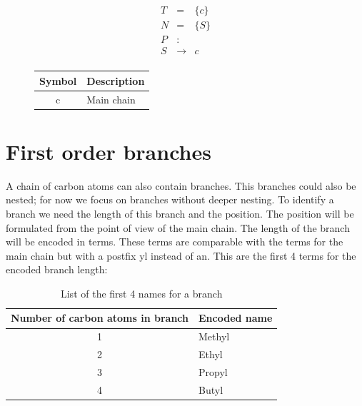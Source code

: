 \documentclass[
fontsize=11pt,
paper=a4,
abstract=true,
numbers=noenddot,
listof=totoc,
bibliography=totoc,
twoside,
open=right,
cleardoublepage=plain,
parskip=half+, %
BCOR=1cm, %
]{scrreprt}
\newcommand{\gerquot}[1]{\glqq#1\grqq}
\newcommand{\captionVSpace}{\vspace*{-0.05cm}}
\newcommand{\CFGDefinitionSize}{0.60}
\newcommand{\SymbolDescriptionTable}{0.35}
\begin{document}
\begin{figure}[H]
    \begin{minipage}[l]{\CFGDefinitionSize\textwidth}
        $$
        \begin{aligned}
            T &=& \{c\} \\
            N &=& \{S\} \\
            P &:& \\
            S &\rightarrow& c \\
        \end{aligned}
        $$
        \caption{The CFG with only straight chains.}
        \label{fig:CFGOnlyStraightChains}
    \end{minipage}
    \begin{minipage}[r]{\SymbolDescriptionTable\textwidth}
        \begin{table}[H]
        \centering
            \begin{tabular}{c|l}
                \toprule
                \textbf{Symbol} & \textbf{Description} \\
                \midrule
                c & Main chain \\
                \bottomrule
            \end{tabular}
        \end{table}
    \end{minipage}
\end{figure}



\section{First order branches}\label{ss:FirstOrderBranches}
A chain of carbon atoms can also contain branches. This branches could also be nested; for now we focus on branches without deeper nesting. To identify a branch we need the length of this branch and the position. The position will be formulated from the point of view of the main chain. The length of the branch will be encoded in terms. These terms are comparable with the terms for the main chain but with a postfix \gerquot{yl} instead of \gerquot{an}. This are the first 4 terms for the encoded branch length:

\begin{table}[H]
    \centering
    \begin{tabular}{c|l}
        \toprule
        \textbf{Number of carbon atoms in branch} & \textbf{Encoded name} \\
        \midrule
        1 & Methyl \\
        2 & Ethyl \\
        3 & Propyl \\
        4 & Butyl \\
        \bottomrule
    \end{tabular}
    \captionVSpace
    \caption{List of the first 4 names for a branch}
    \label{tab:NumCarbonBranchEncodedName}
\end{table}
\end{document}
